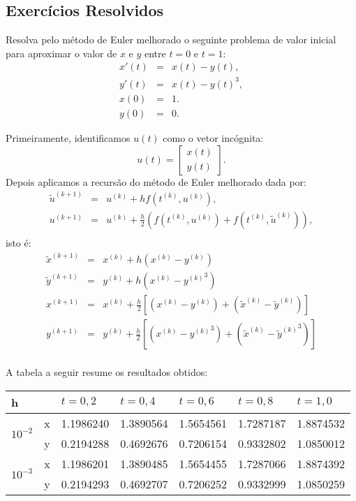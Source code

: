 \subsection*{Exercícios Resolvidos}
\begin{exeresol} Resolva pelo método de Euler melhorado o seguinte problema de valor inicial para aproximar o valor de $x$ e $y$ entre $t=0$ e $t=1$:
\begin{eqnarray}
x'(t)&=&x(t)-y(t),\\
y'(t)&=&x(t)-y(t)^3,\\
x(0)&=&1.\\
y(0)&=&0.
\end{eqnarray}
\end{exeresol}
\begin{resol}
 Primeiramente, identificamos $u(t)$ como o vetor incógnita:
 \begin{equation} u(t)=\left[\begin{array}{c}x(t)\\y(t)\end{array}\right]. \end{equation}
Depois aplicamos a recursão do método de Euler melhorado dada por:
 \begin{eqnarray}
\tilde{u}^{(k+1)}&=&u^{(k)}+hf(t^{(k)},u^{(k)}),\\
u^{(k+1)}&=&u^{(k)}+\frac{h}{2}\left(f(t^{(k)},u^{(k)})+f(t^{(k)},\tilde{u}^{(k)})\right),\\
\end{eqnarray}
isto é:
 \begin{eqnarray}
\tilde{x}^{(k+1)}&=&x^{(k)}+h\left(x^{(k)}-y^{(k)}\right)\\
\tilde{y}^{(k+1)}&=&y^{(k)}+h\left(x^{(k)}-{y^{(k)}}^3\right)\\
{x}^{(k+1)}&=&x^{(k)}+\frac{h}{2}\left[\left({x}^{(k)}-{y}^{(k)}\right)+\left(\tilde{x}^{(k)}-\tilde{y}^{(k)}\right)\right]\\
{y}^{(k+1)}&=&y^{(k)}+\frac{h}{2}\left[\left({x}^{(k)}-{{y}^{(k)}}^3\right)+ \left(\tilde{x}^{(k)}-\left.{\tilde{y}^{(k)}}\right.^3\right)\right]\\
 \end{eqnarray}

 A tabela a seguir resume os resultados obtidos:


 \begin{center}
 \begin{tabular}{|l|l|l|l|l|l|l|}%
\hline
   h&&$t=0,2$&$t=0,4$&$t=0,6$&$t=0,8$&$t=1,0$\\
   \hline
   \multirow{2}{*}{$10^{-2}$} &x  &1.1986240 &1.3890564 &1.5654561 &1.7287187 &1.8874532 \\
			       &y&0.2194288 &0.4692676 &0.7206154 &0.9332802 &1.0850012 \\
   \hline
  \multirow{2}{*}{$10^{-3}$} &x  &1.1986201 &1.3890485 &1.5654455 &1.7287066 &1.8874392\\
			       &y &0.2194293 &0.4692707 &0.7206252 &0.9332999 &1.0850259\\
			       \hline



\end{tabular}
\end{center}
\end{resol}
